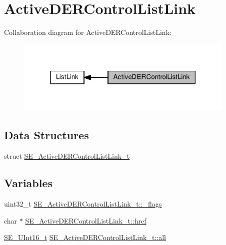 \hypertarget{group__ActiveDERControlListLink}{}\section{Active\+D\+E\+R\+Control\+List\+Link}
\label{group__ActiveDERControlListLink}
Collaboration diagram for Active\+D\+E\+R\+Control\+List\+Link\+:\nopagebreak
\begin{figure}[H]
\begin{center}
\leavevmode
\includegraphics[width=297pt]{group__ActiveDERControlListLink}
\end{center}
\end{figure}
\subsection*{Data Structures}
\begin{DoxyCompactItemize}
\item 
struct \hyperlink{structSE__ActiveDERControlListLink__t}{S\+E\+\_\+\+Active\+D\+E\+R\+Control\+List\+Link\+\_\+t}
\end{DoxyCompactItemize}
\subsection*{Variables}
\begin{DoxyCompactItemize}
\item 
uint32\+\_\+t \hyperlink{group__ActiveDERControlListLink_gaeecb69aecac21e9415585eb108272309}{S\+E\+\_\+\+Active\+D\+E\+R\+Control\+List\+Link\+\_\+t\+::\+\_\+flags}
\item 
char $\ast$ \hyperlink{group__ActiveDERControlListLink_gad2afedb20cb4a7d70e5fb38623cd10c7}{S\+E\+\_\+\+Active\+D\+E\+R\+Control\+List\+Link\+\_\+t\+::href}
\item 
\hyperlink{group__UInt16_gac68d541f189538bfd30cfaa712d20d29}{S\+E\+\_\+\+U\+Int16\+\_\+t} \hyperlink{group__ActiveDERControlListLink_ga5207254c0fefaa2e950d854bd911ede8}{S\+E\+\_\+\+Active\+D\+E\+R\+Control\+List\+Link\+\_\+t\+::all}
\end{DoxyCompactItemize}


